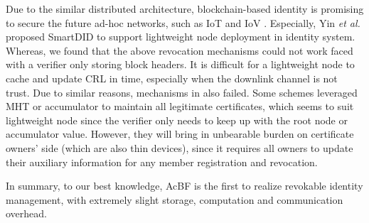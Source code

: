 \documentclass[conference]{IEEEtran}
\begin{document}
Due to the similar distributed architecture, blockchain-based identity is promising to secure the future ad-hoc networks, such as IoT and IoV \cite{cui2022efficient, singh2018branch, smartdid, yu2019blockchain}. Especially, Yin \textit{et al.} \cite{smartdid} proposed SmartDID to support lightweight node deployment in identity system. %
Whereas, we found that the above revocation mechanisms could not work faced with a verifier only storing block headers. It is difficult for a lightweight node to cache and update CRL in time, especially when the downlink channel is not trust. Due to similar reasons, mechanisms in \cite{luoScalaCertScalabilityOrientedPKI2022a, jiaRedactableBlockchainDecentralized2022} also failed. Some schemes leveraged MHT \cite{certledger} or accumulator \cite{yu2019blockchain} to maintain all legitimate certificates, which seems to suit lightweight node since the verifier only needs to keep up with the root node or accumulator value. 
However, they will bring in unbearable burden on certificate owners' side (which are also thin devices), since it requires all owners to update their auxiliary information for any member registration and revocation. 

In summary, to our best knowledge, AcBF is the first to realize revokable identity management, with extremely slight storage, computation and communication overhead. %

\end{document}
